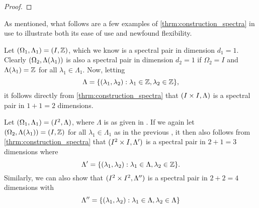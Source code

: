 \documentclass[../thesis.tex]{subfiles}
\begin{document}
\begin{proof}
\end{proof}
As mentioned, what follows are a few examples of \cref{thrm:construction_spectra} in use to illustrate both its ease of use and newfound flexibility. 
\begin{example}\label{exmp:first_construction}
    Let $(\Omega_1,\Lambda_1)=(I, \mathbb{Z})$, which we know is a spectral pair in dimension $d_1=1$. Clearly $(\Omega_2,\Lambda(\lambda_1))$ is also a spectral pair in dimension $d_2=1$ if $\Omega_2=I$ and $\Lambda(\lambda_1) = \mathbb{Z}$ for all $\lambda_1 \in \Lambda_1$. Now, letting 
    \begin{equation}\label{eq:first_construction}
        \Lambda  = \{(\lambda_1,\lambda_2): \lambda_1 \in \mathbb{Z}, \lambda_2 \in \mathbb{Z} \},
    \end{equation}
    it follows directly from \cref{thrm:construction_spectra} that $(I \times I, \Lambda)$ is a spectral pair in $1+1=2$ dimensions.
\end{example}

\begin{example}\label{exmp:second_construction}
    Let $(\Omega_1,\Lambda_1) = (I^2, \Lambda)$, where $\Lambda$ is as given in . If we again let 
    $(\Omega_2,\Lambda(\lambda_1)) = (I, \mathbb{Z})$ for all $\lambda_1 \in \Lambda_1$ as in the previous , it then also follows from \cref{thrm:construction_spectra} that $(I^2 \times I, \Lambda')$ is a spectral pair in $2+1=3$ dimensions where 
    \begin{equation*}
        \Lambda'=\{(\lambda_1,\lambda_2): \lambda_1 \in \Lambda, \lambda_2 \in \mathbb{Z} \}.
    \end{equation*}
    Similarly, we can also show that $(I^2 \times I^2, \Lambda'')$ is a spectral pair in $2+2=4$ dimensions with
    \begin{equation*}
        \Lambda''=\{(\lambda_1,\lambda_2): \lambda_1 \in \Lambda, \lambda_2 \in \Lambda\} \qedhere
    \end{equation*}
\end{example}
\end{document}
